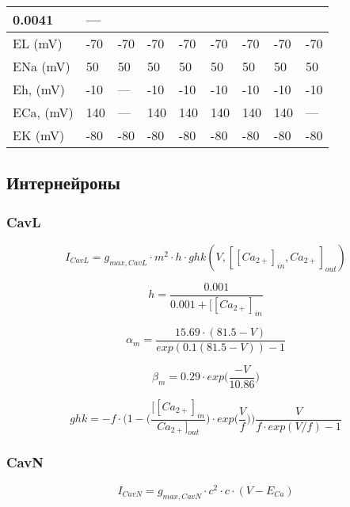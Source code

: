 \documentclass[12pt]{article}
\begin{document}
\begin{table}[h]
\begin{center}
\begin{tabular}{ |p{2cm} | p{1.25cm} |p{1.25cm} |p{1.25cm} |p{1.25cm} |p{1.25cm} |p{1.25cm} |p{1.25cm} |p{1.25cm} | }
0.0041 & --- \\ \hline  EL (mV) & -70 & -70 & -70 & -70 & -70 & -70 & -70 & -70 \\ \hline  ENa (mV) & 50 & 50 & 50 & 50 & 50 & 50 & 50 & 50 \\ \hline  Eh, (mV) & -10 & --- & -10 & -10 & -10 & -10 & -10 & -10 \\ \hline  ECa, (mV) & 140 & --- & 140 & 140 & 140 & 140 & 140 & --- \\ \hline  EK (mV) & -80 & -80 & -80 & -80 & -80 & -80 & -80 & -80 \\ \hline  
			
		\end{tabular}
	\end{center}
\end{table}

\subsection{Интернейроны}
\subsubsection{CavL}
\begin{equation}
I_{CavL} = g_{max, CavL} \cdot m^2 \cdot h \cdot ghk(V, [[Ca_{2+}]_{in}, Ca_{2+}]_{out} )
\end{equation}

\begin{equation}
h = \frac{0.001}{0.001 +[[Ca_{2+}]_{in} }
\end{equation}

\begin{equation}
\alpha_{m} = \frac{15.69 \cdot (81.5-V)}{exp(0.1(81.5-V)) - 1}
\end{equation}

\begin{equation}
\beta_{m} = 0.29 \cdot exp \Big(\frac{-V}{10.86}\Big)
\end{equation}

\begin{equation}
ghk = -f \cdot \Big(1 - \Big(\frac{[[Ca_{2+}]_{in}}{Ca_{2+}]_{out}} \Big) \cdot exp \Big(\frac{V}{f}\Big) \Big) \frac{V}{f \cdot exp(V/f) -1 }
\end{equation}

\subsubsection{CavN}
\begin{equation}
I_{CavN} = g_{max, CavN} \cdot c^2 \cdot c \cdot (V - E_{Ca})
\end{equation}
\end{document}
